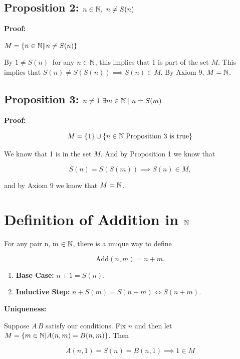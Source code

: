 \subsection{Proposition 2: \texorpdfstring{ \(n \in \mathbb{N},\ n \ne S(n)\)}{ For any n in N, n!= S (n)}}

\textbf{Proof:} 

\(M = \{n \in \N \| n \ne S(n) \}\ \)

By \(1 \ne S(n)\ \) for any \(n \in \mathbb{N}\), this implies that 1 is part of the set \(M\). 
This implies that \(S(n) \ne S(S(n)) \implies S(n) \in M\). By Axiom 9, \(M = \mathbb{N}\).

\subsection{Proposition 3: \texorpdfstring{\(n \ne 1\ \exists m \in \mathbb{N} \mid n = S(m)\)}{n!= 1, exists m in N | n = S (m)}}

\textbf{Proof:}

\[
	M = \{1\} \cup\{n \in \mathbb{N} | \text{Proposition 3 is true}\}
\]

We know that 1 is in the set \(M\). And by Proposition 1 we know that

\[
	S(n) = S(S(m)) \implies S(n) \in M,
\]

and by Axiom 9 we know that \(M = \mathbb{N}\).

\section{Definition of Addition in \texorpdfstring{\(\mathbb{N}\)}{}}

For any pair n, m \(\in \mathbb{N}\), there is a unique way to define

\[
	\mathrm{Add}(n , m) = n + m.
\]

\begin{enumerate}
	
	\item \textbf{Base Case:} \(n + 1 = S(n)\).

	\item \textbf{Inductive Step:} \(n + S(m) = S(n + m) \iff S(n + m)\).

\end{enumerate}

\textbf{Uniqueness:} 

Suppose \(A \, B\) satisfy our conditions. Fix \(n\) and then let \(M = \{ m \in \mathbb{N} | 
A(n,m) = B(n, m)\}\). Then

\[
	A(n,1) = S(n) = B(n,1) \implies 1 \in M
\]

